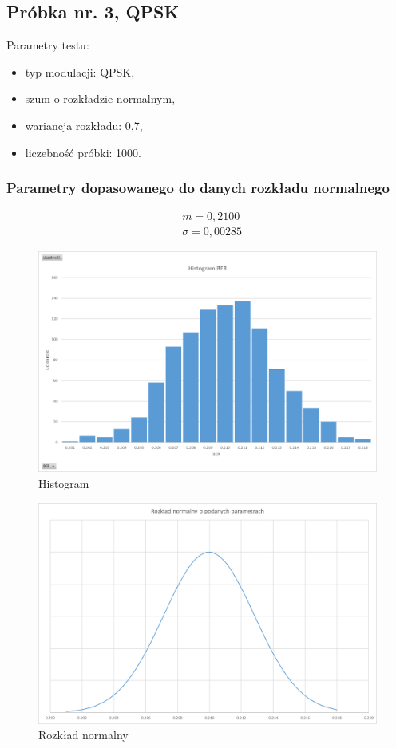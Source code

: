 \documentclass{article}
\begin{document}
	\newpage
	\subsection{Próbka nr. 3, QPSK}
		Parametry testu:
		\begin{itemize}
			\item typ modulacji: QPSK,
			\item szum o rozkładzie normalnym,
			\item wariancja rozkładu: 0,7,
			\item liczebność próbki: 1000.
		\end{itemize}
		
		\subsubsection{Parametry dopasowanego do danych rozkładu normalnego}
			\begin{align*}
				&m = 0,2100\\
				&\sigma = 0,00285
			\end{align*}
		
			\begin{figure}[H]
				\centering
				\includegraphics[width=0.8\linewidth]{img/hist_qpsk07.png}
				\caption{Histogram}
			\end{figure}
			\begin{figure}[H]
				\centering
				\includegraphics[width=0.8\linewidth]{img/rozk_qpsk07.png}
				\caption{Rozkład normalny}
			\end{figure}
		
\end{document}

